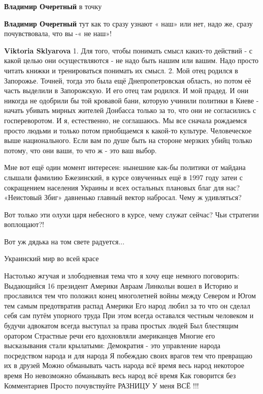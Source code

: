 \begin{itemize}
\begin{itemize} %
\textbf{Владимир Очеретный} в точку

\textbf{Владимир Очеретный} тут как то сразу узнают « наш» или нет, надо же, сразу почувствовала, что вы -« не наш»!

\textbf{Viktoria Sklyarova} 1. Для того, чтобы понимать смысл каких-то действий
- с какой целью они осуществляются - не надо быть нашим или вашим. Надо просто
читать книжки и тренироваться понимать их смысл. 2. Мой отец родился в
Запорожье. Точней, тогда это была ещё Днепропетровская область, но потом её
часть выделили в Запорожскую. И его отец там родился. И мой прадед. И они
никогда не одобрили бы той кровавой бани, которую учинили политики в Киеве -
начать убивать мирных жителей Донбасса только за то, что они не согласились с
госпереворотом. И я, естественно, не соглашаюсь. Мы все сначала рождаемся
просто людьми и только потом приобщаемся к какой-то культуре. Человеческое выше
национального. Если вам по душе быть на стороне мерзких убийц только потому,
что они ваши, то что ж - это ваш выбор.
\end{itemize} %


Мне вот ещё один момент интересен: нынешние как-бы политики от майдана слышали
фамилию Бжезинский, в курсе озвученных ещё в 1997 году затеи с сокращением
населения Украины и всех остальных плановых благ для нас? «Неистовый Збиг»
давненько главный вектор набросал. Чему ж удивляться?

Вот только эти олухи царя небесного в курсе, чему служат сейчас? Чьи стратегии
воплощают?!

Вот уж дядька на том свете радуется...

Украинский мир во всей красе


Настолько жгучая и злободневная тема что я хочу еще немного поговорить:
Выдающийся 16 президент Америки Авраам Линкольн вошел в Историю и прославился
тем что положил конец многолетней войны между Севером и Югом тем самым
предотвратив распад Америки Его народ любил за то что он сделал себя сам путём
упорного труда При этом всегда оставался честным человеком и будучи адвокатом
всегда выступал за права простых людей Был блестящим оратором Страстные речи
его вдохновляли американцев Многие его высказывания стали крылатыми: Демократия
- это управление народа посредством народа и для народа Я побеждаю своих врагов
тем что превращаю их в друзей Можно обманывать часть народа всё время весь
народ некоторое время Но невозможно обманывать весь народ всё время Как
говорится без Комментариев Просто почувствуйте РАЗНИЦУ У меня ВСЁ !!!


\end{itemize}
